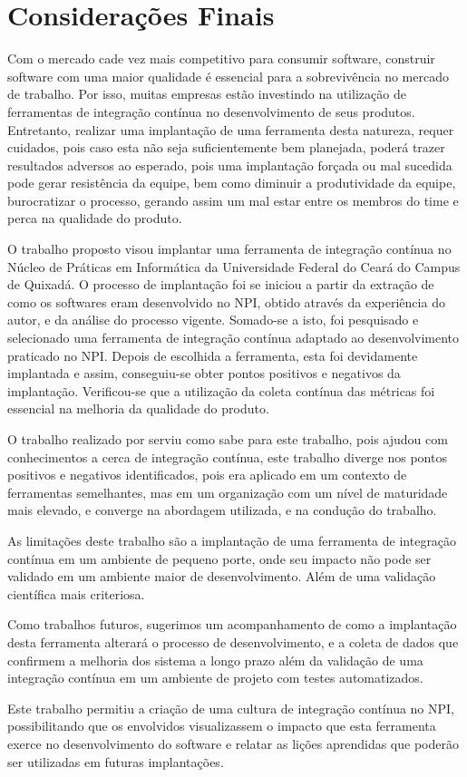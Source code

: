 \chapter{Considerações Finais}\label{consideracoes-finais}

Com o mercado cade vez mais competitivo para consumir software, construir software com uma maior qualidade é essencial para a sobrevivência no mercado de trabalho. Por isso, muitas empresas estão investindo na utilização de ferramentas de integração contínua no desenvolvimento de seus produtos. Entretanto, realizar uma implantação de uma ferramenta desta natureza, requer cuidados, pois caso esta não seja suficientemente bem planejada, poderá trazer resultados adversos ao esperado, pois uma implantação forçada ou mal sucedida pode gerar resistência da equipe, bem como diminuir a produtividade da equipe, burocratizar o processo, gerando assim um mal estar entre os membros do time e perca na qualidade do produto.

O trabalho proposto visou implantar uma ferramenta de integração contínua no Núcleo de Práticas em Informática da Universidade Federal do Ceará do Campus de Quixadá. O processo de implantação foi se iniciou a partir da extração de como os softwares eram desenvolvido no NPI, obtido através da experiência do autor, e da análise do processo vigente. Somado-se a isto, foi pesquisado e selecionado uma ferramenta de integração contínua adaptado ao desenvolvimento praticado no NPI. Depois de escolhida a ferramenta, esta foi devidamente implantada e assim, conseguiu-se obter pontos positivos e negativos da implantação. Verificou-se que a utilização da coleta contínua das métricas foi essencial na melhoria da qualidade do produto.


O trabalho realizado por  serviu como sabe para este trabalho, pois ajudou com conhecimentos a cerca de integração contínua, este trabalho diverge nos pontos positivos e negativos identificados, pois era aplicado em um contexto de ferramentas semelhantes, mas em um organização com um nível de maturidade mais elevado, e converge na abordagem utilizada, e na condução do trabalho.
 

As limitações deste trabalho são a implantação de uma ferramenta de integração contínua em um ambiente de pequeno porte, onde seu impacto não pode ser validado em um ambiente maior de desenvolvimento. Além de uma validação científica mais criteriosa.

Como trabalhos futuros, sugerimos um acompanhamento de como a implantação desta ferramenta alterará o processo de desenvolvimento, e a coleta de dados que confirmem a melhoria dos sistema a longo prazo além da validação de uma integração contínua em um ambiente de projeto com testes automatizados.


Este trabalho permitiu a criação de uma cultura de integração contínua no NPI, possibilitando que os envolvidos visualizassem o impacto que esta ferramenta exerce no desenvolvimento do software e relatar as lições aprendidas que poderão ser utilizadas em futuras implantações.

